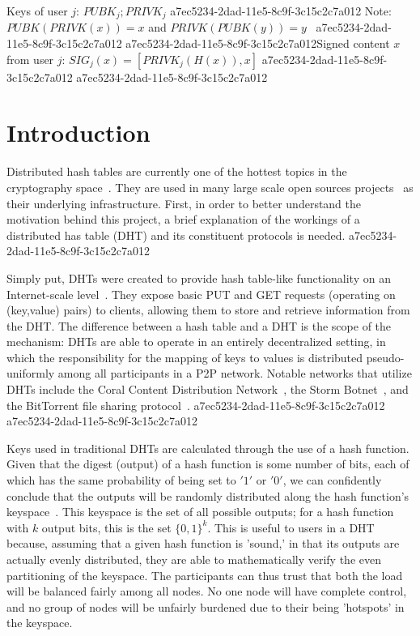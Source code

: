 \documentclass[12pt]{article}
\begin{document}
Keys of user $j$: $ PUBK_j; PRIVK_j $
a7ec5234-2dad-11e5-8c9f-3c15c2c7a012
Note: $PUBK(PRIVK(x)) = x$ and $PRIVK(PUBK(y)) = y$~
a7ec5234-2dad-11e5-8c9f-3c15c2c7a012
a7ec5234-2dad-11e5-8c9f-3c15c2c7a012Signed content $x$ from user $j$: $SIG_j(x) = \left[ PRIVK_j( H(x) ), x \right]$
a7ec5234-2dad-11e5-8c9f-3c15c2c7a012
a7ec5234-2dad-11e5-8c9f-3c15c2c7a012\section{Introduction}
\par Distributed hash tables are currently one of the hottest topics in the cryptography space~\cite{Stoica:2001dj,Rowstron:2001ea,Ratnasamy:2001wn}. They are used in many large scale open sources projects~\cite{Freitas:2013tb,Xu:2010vs,Perfitt:2010fh} as their underlying infrastructure. First, in order to better understand the motivation behind this project, a brief explanation of the workings of a distributed has table (DHT) and its constituent protocols is needed.
a7ec5234-2dad-11e5-8c9f-3c15c2c7a012
\par Simply put, DHTs were created to provide hash table-like functionality on an Internet-scale level~\cite{Ratnasamy:2001wn}. They expose basic PUT and GET requests (operating on (key,value) pairs) to clients, allowing them to store and retrieve information from the DHT. The difference between a hash table and a DHT is the scope of the mechanism: DHTs are able to operate in an entirely decentralized setting, in which the responsibility for the mapping of keys to values is distributed pseudo-uniformly among all participants in a P2P network. Notable networks that utilize DHTs include the Coral Content Distribution Network~\cite{Freedman:2004vb}, the Storm Botnet~\cite{Holz:2008uk}, and the BitTorrent file sharing protocol~\cite{Cohen:y1_8mBnw}.
a7ec5234-2dad-11e5-8c9f-3c15c2c7a012
a7ec5234-2dad-11e5-8c9f-3c15c2c7a012\par Keys used in traditional DHTs are calculated through the use of a hash function. Given that the digest (output) of a hash function is some number of bits, each of which has the same probability of being set to $'1'$ or $'0'$, we can confidently conclude that the outputs will be randomly distributed along the hash function's keyspace~. This keyspace is the set of all possible outputs; for a hash function with $k$ output bits, this is the set $\{0,1\}^k$. This is useful to users in a DHT because, assuming that a given hash function is 'sound,' in that its outputs are actually evenly distributed, they are able to mathematically verify the even partitioning of the keyspace. The participants can thus trust that both the load will be balanced fairly among all nodes. No one node will have complete control, and no group of nodes will be unfairly burdened due to their being 'hotspots' in the keyspace.~
\end{document}
